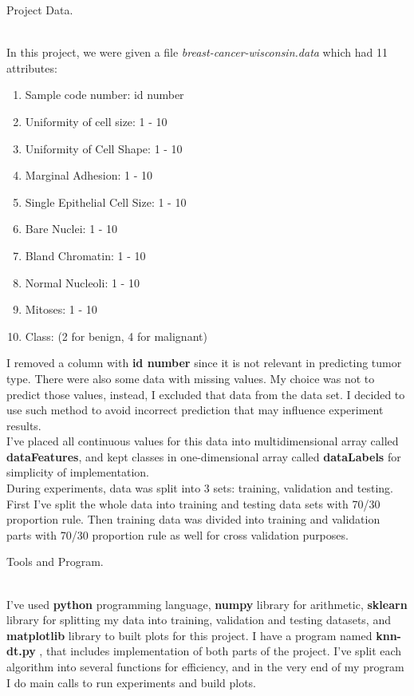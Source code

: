 \documentclass[12pt, letterpaper]{article}
\begin{document}
\begin{enumerate}[label=\Roman*.]
	
	{\bf \item Project Data.} \\
	
	 In this project, we were given a file {\it breast-cancer-wisconsin.data} which had 11 attributes:
	 \begin{enumerate}[label=\arabic*.]
	 	\item Sample code number: id number
		\item Uniformity of cell size: 1 - 10
		\item Uniformity of Cell Shape: 1 - 10
		\item Marginal Adhesion: 1 - 10
		\item Single Epithelial Cell Size: 1 - 10
		\item Bare Nuclei: 1 - 10
		\item Bland Chromatin: 1 - 10
		\item Normal Nucleoli: 1 - 10
		\item Mitoses: 1 - 10
		\item Class: (2 for benign, 4 for malignant)
	\end{enumerate}
	
	I removed a column with {\bf id number}  since it is not relevant in predicting tumor type. There were also some data with missing values. My choice was not to predict those values, instead, I excluded that data from the data set. I decided to use such method to avoid incorrect prediction that may influence experiment results. \\
	
	I've placed all continuous values for this data into multidimensional array called {\bf dataFeatures}, and kept classes in one-dimensional array called {\bf dataLabels} for simplicity of implementation. \\
	During experiments, data was split into 3 sets: training, validation and testing. First I've split the whole data into training and testing data sets with 70/30 proportion rule. Then training data was divided into training and validation parts with 70/30 proportion rule as well for cross validation purposes. \\
	
	{\bf \item Tools and Program.}\\
	
	I've used {\bf python} programming language, {\bf numpy} library for arithmetic, {\bf sklearn} library for splitting my data into training, validation and testing datasets, and {\bf matplotlib} library to built plots for this project. I have a program named {\bf knn-dt.py} , that includes implementation of both parts of the project. I've split each algorithm into several functions for efficiency, and in the very end of my program I do main calls to run experiments and build plots.\\
	

\end{enumerate}
\end{document}
